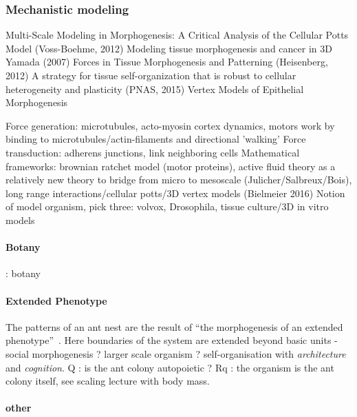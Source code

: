 \documentclass{article}
\begin{document}



\subsubsection{Mechanistic modeling}
Multi-Scale Modeling in Morphogenesis: A Critical Analysis of the Cellular Potts Model (Voss-Boehme, 2012)
Modeling tissue morphogenesis and cancer in 3D Yamada (2007)
Forces in Tissue Morphogenesis and Patterning (Heisenberg, 2012)
A strategy for tissue self-organization that is robust to
cellular heterogeneity and plasticity (PNAS, 2015)
Vertex Models of Epithelial Morphogenesis

Force generation: microtubules, acto-myosin cortex dynamics, motors work by binding to microtubules/actin-filaments and directional 'walking'
Force transduction: adherens junctions, link neighboring cells
Mathematical frameworks: brownian ratchet model (motor proteins), active fluid theory as a relatively new theory to bridge from micro to mesoscale (Julicher/Salbreux/Bois), long range interactions/cellular potts/3D vertex models (Bielmeier 2016)
Notion of model organism, pick three: volvox, Drosophila, tissue culture/3D in vitro models 

\paragraph{Botany}

\cite{lord1981cleistogamy} : botany

\paragraph{Extended Phenotype}

The patterns of an ant nest are the result of ``the morphogenesis of an extended phenotype''~\cite{minter2012morphogenesis}. Here boundaries of the system are extended beyond basic units - social morphogenesis ? larger scale organism ? self-organisation with \emph{architecture} and \emph{cognition}. Q : is the ant colony autopoietic ? Rq : the organism is the ant colony itself, see scaling lecture with body mass.


\paragraph{other}
\end{document}
